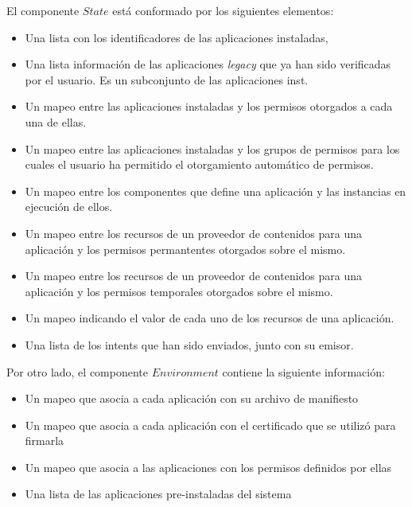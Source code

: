 El componente $State$ está conformado por los siguientes elementos:

\begin{itemize}
    \item Una lista con los identificadores de las aplicaciones instaladas,
    \item Una lista  información de las aplicaciones \textit{legacy} que ya han sido verificadas por
    el usuario. Es un subconjunto de las aplicaciones inst.
    \item Un mapeo entre las aplicaciones instaladas y los permisos otorgados a cada una de ellas.
    \item Un mapeo entre las aplicaciones instaladas y los grupos de permisos para los cuales el
    usuario ha permitido el otorgamiento automático de permisos. 
    \item Un mapeo entre los componentes que define una aplicación y las instancias en ejecución de
    ellos.
    \item Un mapeo entre los recursos de un proveedor de contenidos para una aplicación y los permisos
    permantentes otorgados sobre el mismo.
    \item Un mapeo entre los recursos de un proveedor de contenidos para una aplicación y los permisos
    temporales otorgados sobre el mismo.
    \item Un mapeo indicando el valor de cada uno de los recursos de una aplicación.
    \item Una lista de los intents que han sido enviados, junto con su emisor.
\end{itemize}

Por otro lado, el componente $Environment$ contiene la siguiente información:

\begin{itemize}
    \item Un mapeo que asocia a cada aplicación con su archivo de manifiesto
    \item Un mapeo que asocia a cada aplicación con el certificado que se utilizó para firmarla
    \item Un mapeo que asocia a las aplicaciones con los permisos definidos por ellas
    \item Una lista de las aplicaciones pre-instaladas del sistema
\end{itemize}

